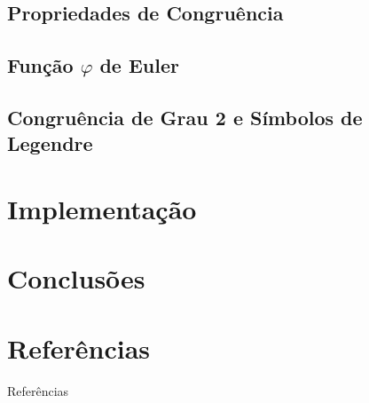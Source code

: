 \documentclass[xcolor=table]{beamer}
\begin{document}
        
        \subsection[]{Propriedades de Congruência} \label{sub:prop-cong}
        
        \subsection[]{Função $\varphi$ de Euler} \label{sub:funcao-phi}
        
        \subsection[]{Congruência de Grau 2 e Símbolos de Legendre} \label{sub:cong-grau2}
              

    
    
    \section[]{Implementação}

        

    \section[]{Conclusões}

   
    \section[]{Referências}
    \begin{frame}[allowframebreaks]{Referências}
        
    \end{frame}
\end{document}
